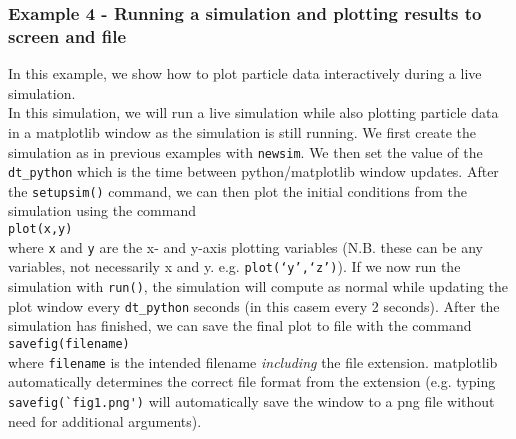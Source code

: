 \documentclass[a4paper]{article}
\newcommand{\var}[1]{\texttt{#1}}
\newcommand{\singlecommand}[1]{\\ \newline \indent \var{#1} \\ \newline \noindent}
\begin{document}
\subsubsection{Example 4 - Running a simulation and plotting results to screen and file}
In this example, we show how to plot particle data interactively during a live simulation. \\






\noindent In this simulation, we will run a live simulation while also plotting particle data in a matplotlib window as the simulation is still running.  We first create the simulation as in previous examples with \var{newsim}.  We then set the value of the \var{dt\_python} which is the time between python/matplotlib window updates.  After the \var{setupsim()} command, we can then plot the initial conditions from the simulation using the command \singlecommand{plot(x,y)} where \var{x} and \var{y} are the x- and y-axis plotting variables (N.B. these can be any variables, not necessarily x and y. e.g. \var{plot(`y',`z')}).  If we now run the simulation with \var{run()}, the simulation will compute as normal while updating the plot window every \var{dt\_python} seconds (in this casem every 2 seconds).  After the simulation has finished, we can save the final plot to file with the command \singlecommand{savefig(filename)} where \var{filename} is the intended filename {\it including} the file extension.  matplotlib automatically determines the correct file format from the extension  (e.g. typing \lstinline{savefig(`fig1.png')} will automatically save the window to a png file without need for additional arguments).


\end{document}
